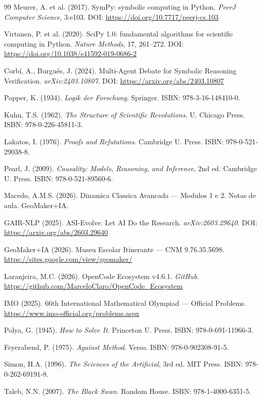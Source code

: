 \documentclass[5p]{elsarticle}
\begin{document}
\begin{thebibliography}{99}
 Meurer, A. et al. (2017). SymPy: symbolic computing in
  Python. \textit{PeerJ Computer Science}, 3:e103.
  DOI: \url{https://doi.org/10.7717/peerj-cs.103}

 Virtanen, P. et al. (2020). SciPy 1.0: fundamental
  algorithms for scientific computing in Python. \textit{Nature Methods}, 17,
  261--272. DOI: \url{https://doi.org/10.1038/s41592-019-0686-2}

 Corbí, A., Burgués, J. (2024). Multi-Agent Debate for
  Symbolic Reasoning Verification. \textit{arXiv:2403.10807}.
  DOI: \url{https://arxiv.org/abs/2403.10807}

 Popper, K. (1934). \textit{Logik der Forschung}. Springer.
  ISBN: 978-3-16-148410-0.

 Kuhn, T.S. (1962). \textit{The Structure of Scientific
  Revolutions}. U. Chicago Press. ISBN: 978-0-226-45811-3.

 Lakatos, I. (1976). \textit{Proofs and Refutations}.
  Cambridge U. Press. ISBN: 978-0-521-29038-8.

 Pearl, J. (2009). \textit{Causality: Models, Reasoning, and
  Inference}, 2nd ed. Cambridge U. Press. ISBN: 978-0-521-89560-6.

 Macedo, A.M.S. (2026). Dinamica Classica Avancada —
  Modulos 1 e 2. Notas de aula. GeoMaker+IA.

 GAIR-NLP (2025). ASI-Evolve: Let AI Do the Research.
  \textit{arXiv:2603.29640}. DOI: \url{https://arxiv.org/abs/2603.29640}

 GeoMaker+IA (2026). Museu Escolar Itinerante — CNM
  9.76.35.5698. \url{https://sites.google.com/view/geomaker/}

 Laranjeira, M.C. (2026). OpenCode Ecosystem v4.6.1.
  \textit{GitHub}. \url{https://github.com/MarceloClaro/OpenCode_Ecosystem}

 IMO (2025). 66th International Mathematical Olympiad —
  Official Problems. \url{https://www.imo-official.org/problems.aspx}

 Polya, G. (1945). \textit{How to Solve It}. Princeton U. Press.
  ISBN: 978-0-691-11966-3.

 Feyerabend, P. (1975). \textit{Against Method}. Verso.
  ISBN: 978-0-902308-91-5.

 Simon, H.A. (1996). \textit{The Sciences of the Artificial},
  3rd ed. MIT Press. ISBN: 978-0-262-69191-8.

 Taleb, N.N. (2007). \textit{The Black Swan}. Random House.
  ISBN: 978-1-4000-6351-5.

\end{thebibliography}
\end{document}
